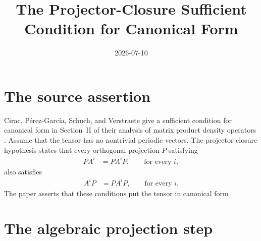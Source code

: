 \documentclass{article}
\title{The Projector-Closure Sufficient Condition for Canonical Form}
\author{}
\date{2026-07-10}
\begin{document}
\maketitle
{}

\section{The source assertion}

Cirac, P\'erez-Garc\'ia, Schuch, and Verstraete give a sufficient condition for
canonical form in Section~II of their analysis of matrix product density
operators \cite{Cirac2016MPDO_arXiv}. Assume that the tensor has no nontrivial
periodic vectors. The projector-closure hypothesis states that every
orthogonal projection $P$ satisfying
\begin{align}
    PA^i
        &=PA^iP,
        \qquad\text{for every }i,
    \label{eq:cpsv16_projector_closure_canonical_form_source_invariant_projection}
\end{align}
also satisfies
\begin{align}
    A^iP
        &=PA^iP,
        \qquad\text{for every }i.
    \label{eq:cpsv16_projector_closure_canonical_form_source_coinvariant_projection}
\end{align}
The paper asserts that these conditions put the tensor in canonical form
\cite[lines~253--254]{Cirac2016MPDO_arXiv}.

\section{The algebraic projection step}
\end{document}
